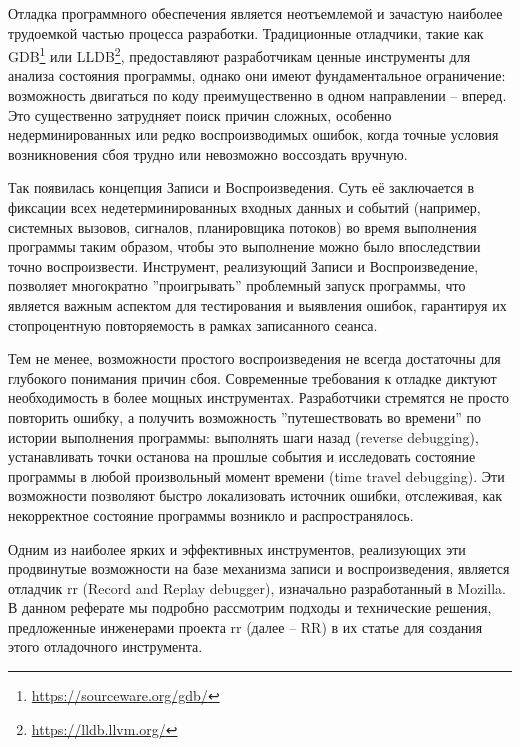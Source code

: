 


Отладка программного обеспечения является неотъемлемой и зачастую наиболее
трудоемкой частью процесса разработки. Традиционные отладчики, такие как
GDB\footnote{\url{https://sourceware.org/gdb/}} или
LLDB\footnote{\url{https://lldb.llvm.org/}}, предоставляют разработчикам ценные
инструменты для анализа состояния программы, однако они имеют фундаментальное
ограничение: возможность двигаться по коду преимущественно в одном направлении
– вперед. Это существенно затрудняет поиск причин сложных, особенно
недерминированных или редко воспроизводимых ошибок, когда точные условия
возникновения сбоя трудно или невозможно воссоздать вручную.

Так появилась концепция Записи и Воспроизведения. Суть её заключается в
фиксации всех недетерминированных входных данных и событий (например, системных
вызовов, сигналов, планировщика потоков) во время выполнения программы таким
образом, чтобы это выполнение можно было впоследствии точно воспроизвести.
Инструмент, реализующий Записи и Воспроизведение, позволяет многократно
''проигрывать'' проблемный запуск программы, что является важным аспектом для
тестирования и выявления ошибок, гарантируя их стопроцентную повторяемость в
рамках записанного сеанса.

Тем не менее, возможности простого воспроизведения не всегда достаточны для
глубокого понимания причин сбоя. Современные требования к отладке диктуют
необходимость в более мощных инструментах. Разработчики стремятся не просто
повторить ошибку, а получить возможность ''путешествовать во времени'' по истории
выполнения программы: выполнять шаги назад (reverse debugging), устанавливать
точки останова на прошлые события и исследовать состояние программы в любой
произвольный момент времени (time travel debugging). Эти возможности позволяют
быстро локализовать источник ошибки, отслеживая, как некорректное состояние
программы возникло и распространялось.

Одним из наиболее ярких и эффективных инструментов, реализующих эти продвинутые
возможности на базе механизма записи и воспроизведения, является отладчик rr
(Record and Replay debugger), изначально разработанный в Mozilla. В данном
реферате мы подробно рассмотрим подходы и технические решения, предложенные
инженерами проекта rr (далее – RR) в их статье \cite{rr-paper}
для создания этого отладочного инструмента.